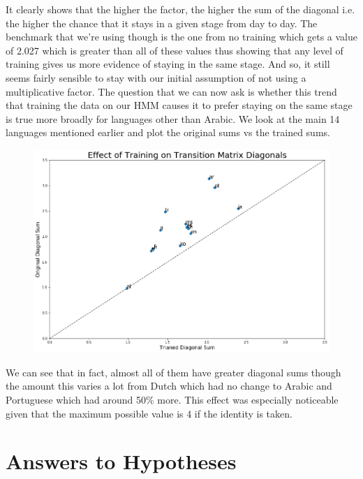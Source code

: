 \documentclass[12pt]{article}
\begin{document}
It clearly shows that the higher the factor, the higher the sum of the diagonal i.e. the higher the chance that it stays in a given stage from day to day. The benchmark that we're using though is the one from no training which gets a value of 2.027 which is greater than all of these values thus showing that any level of training gives us more evidence of staying in the same stage. And so, it still seems fairly sensible to stay with our initial assumption of not using a multiplicative factor. The question that we can now ask is whether this trend that training the data on our HMM causes it to prefer staying on the same stage is true more broadly for languages other than Arabic. We look at the main 14 languages mentioned earlier and plot the original sums vs the trained sums.
\FloatBarrier
\begin{figure}[hbtp]\centering
\includegraphics[width=\textwidth,clip]{TrainingEffectDiagonals.png}
\end{figure}
\FloatBarrier

We can see that in fact, almost all of them have greater diagonal sums though the amount this varies a lot from Dutch which had no change to Arabic and Portuguese which had around 50\% more. This effect was especially noticeable given that the maximum possible value is 4 if the identity is taken.

\newpage
\section{Answers to Hypotheses}
\end{document}

